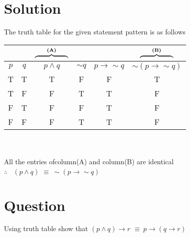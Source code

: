 \documentclass[17pt]{extarticle}
\newcommand{\lto}{\mathbin{\to}}
\begin{document}
\begin{fleqn}
\section{Solution}
The truth table for the given statement pattern is as follows \\
\begin{tabular}{|c*{5}{c|}}
\multicolumn{2}{c}{}&
\multicolumn{1}{c}{%
  $\overbrace{\hphantom{(p\land q)\lto p}}^{\textbf{(A)}}$ %
}
&\multicolumn{2}{c}{}&
\multicolumn{1}{c}{%
  $\overbrace{\hphantom{p\lto (p\lor q)}}^{\textbf{(B)}}$%
}\\
\hline
$p$ & $q$ & $p\land q$ & $ \sim q$ & $p\to \sim q$ & $\sim(p \to \sim q)$\\
\hline
 T & T & T & F & F & T\\
 T & F & F & T & T & F\\
 F & T & F & F & T & F\\
 F & F & F & T & T & F \\
 \hline
\end{tabular} \\ \\
All the entries ofcolumn(A) and column(B) are identical \\
$\therefore$ \ $(p \wedge q) $ $ \equiv \ \sim(p \to \sim q)$ 


\section{Question}
Using truth table show that $(p \wedge q) \to r$ $ \equiv \ p \to (q \to r)$ 



\end{fleqn}
\end{document}
